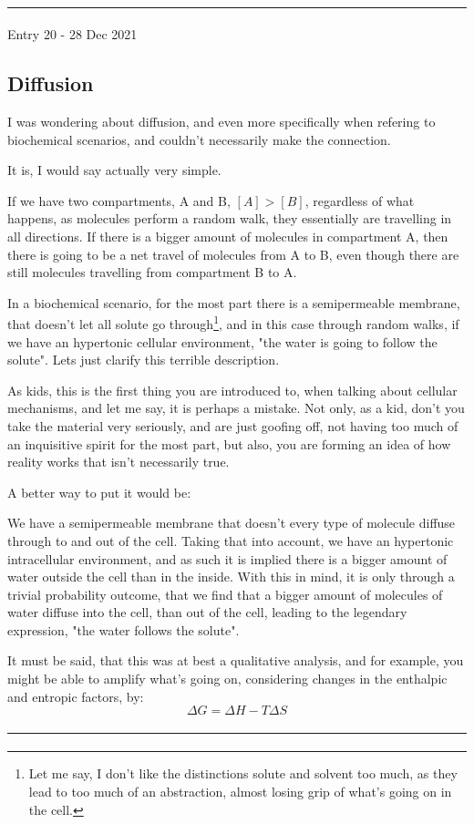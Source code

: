 \documentclass[12pt,  letterpaper]{article}
\begin{document}
\paragraph*{}
\hrule
\paragraph*{}
Entry 20 - 28 Dec 2021
\subsection*{Diffusion}
I was wondering about diffusion, and even more specifically when refering to biochemical scenarios, and couldn't necessarily make the connection.\par It is, I would say actually very simple.\par 
If we have two compartments, A and B, $[A]>[B]$, regardless of what happens, as molecules perform a random walk, they essentially are travelling in all directions. If there is a bigger amount of molecules in compartment A, then there is going to be a net travel of molecules from A to B, even though there are still molecules travelling from compartment B to A.\par 
In a biochemical scenario, for the most part there is a semipermeable membrane, that doesn't let all solute go through\footnote{Let me say, I don't like the distinctions solute and solvent too much, as they lead to too much of an abstraction, almost losing grip of what's going on in the cell.}, and in this case through random walks, if we have an hypertonic cellular environment, "the water is going to follow the solute". Lets just clarify this terrible description.\par 
As kids, this is the first thing you are introduced to, when talking about cellular mechanisms, and let me say, it is perhaps a mistake. Not only, as a kid, don't you take the material very seriously, and are just goofing off, not having too much of an inquisitive spirit for the most part, but also, you are forming an idea of how reality works that isn't necessarily true.
\par 
A better way to put it would be:
\par 
We have a semipermeable membrane that doesn't every type of molecule diffuse through to and out of the cell. Taking that into account, we have an hypertonic intracellular environment, and as such it is implied there is a bigger amount of water outside the cell than in the inside. With this in mind, it is only through a trivial probability outcome, that we find that a bigger amount of molecules of water diffuse into the cell, than out of the cell, leading to the legendary expression, "the water follows the solute".\par 
It must be said, that this was at best a qualitative analysis, and for example, you might be able to amplify what's going on, considering changes in the enthalpic and entropic factors, by:
\begin{equation}
\Delta G = \Delta H - T\Delta S
\end{equation}
\paragraph*{}
\hrule
\paragraph*{}
\end{document}
